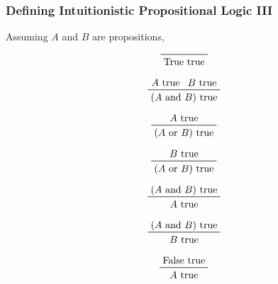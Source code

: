 \documentclass{beamer}
\begin{document}
\begin{frame}
  \frametitle{Defining Intuitionistic Propositional Logic III}
  Assuming $A$ and $B$ are propositions,
  \vspace{-1em}
  \begin{center}
    \begin{minipage}[b]{0.3\linewidth}
      \begin{displaymath}
        \prftree[r]{}{\text{True true}}
      \end{displaymath}
    \end{minipage}
    \begin{minipage}[b]{0.3\linewidth}
      \begin{displaymath}
        \prftree[r]{}{A\text{ true}}{B\text{ true}}
          {(A\text{ and }B)\text{ true}}
      \end{displaymath}
    \end{minipage}
    \begin{minipage}[b]{0.3\linewidth}
      \begin{displaymath}
        \prftree[r]{}{A\text{ true}}{(A\text{ or }B)\text{ true}}
      \end{displaymath}
    \end{minipage}
    \begin{minipage}[b]{0.3\linewidth}
      \begin{displaymath}
        \prftree[r]{}{B\text{ true}}{(A\text{ or }B)\text{ true}}
      \end{displaymath}
    \end{minipage}
    \begin{minipage}[b]{0.3\linewidth}
      \begin{displaymath}
        \prftree[r]{}{(A\text{ and }B)\text{ true}}{A\text{ true}}
      \end{displaymath}
    \end{minipage}
    \begin{minipage}[b]{0.3\linewidth}
      \begin{displaymath}
        \prftree[r]{}{(A\text{ and }B)\text{ true}}{B\text{ true}}
      \end{displaymath}
    \end{minipage}
    \begin{minipage}[b]{0.3\linewidth}
      \begin{displaymath}
        \prftree[r]{}{\text{False true}}{A\text{ true}}
      \end{displaymath}

\end{minipage}
\end{center}
\end{frame}
\end{document}
